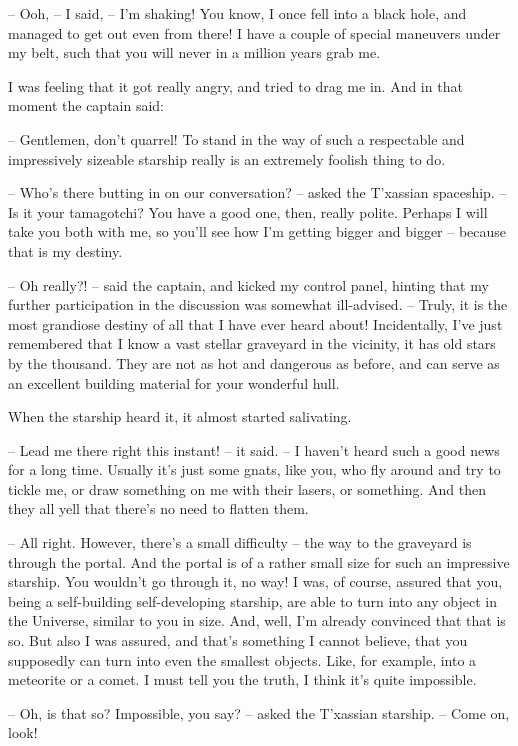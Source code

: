 \documentclass[ebook,oneside,final,openright]{memoir}
\begin{document}
– Ooh, – I said, – I’m shaking! You know, I once fell into a black hole, and managed to get out even from there! I have a couple of special maneuvers under my belt, such that you will never in a million years grab me.\par
\par
I was feeling that it got really angry, and tried to drag me in. And in that moment the captain said:\par
– Gentlemen, don’t quarrel! To stand in the way of such a respectable and impressively sizeable starship really is an extremely foolish thing to do.\par
– Who’s there butting in on our conversation? – asked the T’xassian spaceship. – Is it your tamagotchi? You have a good one, then, really polite. Perhaps I will take you both with me, so you’ll see how I’m getting bigger and bigger – because that is my destiny.\par
– Oh really?! – said the captain, and kicked my control panel, hinting that my further participation in the discussion was somewhat ill-advised. – Truly, it is the most grandiose destiny of all that I have ever heard about! Incidentally, I’ve just remembered that I know a vast stellar graveyard in the vicinity, it has old stars by the thousand. They are not as hot and dangerous as before, and can serve as an excellent building material for your wonderful hull.\par
When the starship heard it, it almost started salivating.\par
– Lead me there right this instant! – it said. – I haven’t heard such a good news for a long time. Usually it’s just some gnats, like you, who fly around and try to tickle me, or draw something on me with their lasers, or something. And then they all yell that there’s no need to flatten them.\par
– All right. However, there’s a small difficulty – the way to the graveyard is through the portal. And the portal is of a rather small size for such an impressive starship. You wouldn’t go through it, no way! I was, of course, assured that you, being a self-building self-developing starship, are able to turn into any object in the Universe, similar to you in size. And, well, I’m already convinced that that is so. But also I was assured, and that’s something I cannot believe, that you supposedly can turn into even the smallest objects. Like, for example, into a meteorite or a comet. I must tell you the truth, I think it’s quite impossible.\par
– Oh, is that so? Impossible, you say? – asked the T’xassian starship. – Come on, look!\par
\end{document}
